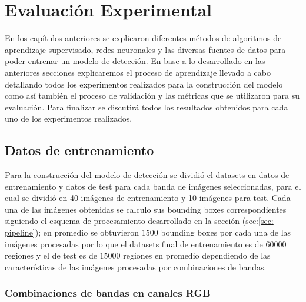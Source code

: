 \chapter{Evaluación Experimental}\label{chap:evaluacion}

En los capítulos anteriores se explicaron diferentes métodos de algoritmos de aprendizaje supervisado, redes neuronales y las diversas fuentes de datos para poder entrenar un modelo de detección. En  base a lo desarrollado en las anteriores secciones  explicaremos el proceso de aprendizaje llevado a cabo detallando todos los  experimentos realizados para la construcción del modelo como así también  el proceso de validación y las métricas que se utilizaron para su evaluación. Para finalizar se discutirá todos los resultados obtenidos para cada uno de los  experimentos realizados. 

\section{Datos de entrenamiento}\label{sec:datos_entrenamiento}

Para la construcción del modelo de detección se dividió el datasets en datos de entrenamiento y datos de test para cada banda de imágenes seleccionadas,  para el cual se dividió en 40 imágenes de entrenamiento y 10 imágenes para test. Cada una de las imágenes obtenidas se calculo sus bounding boxes correspondientes  siguiendo el esquema de procesamiento desarrollado  en la sección (sec:\ref{sec: pipeline}); en promedio se obtuvieron $1500$ bounding boxes por cada una de las imágenes procesadas por lo que el datasets final de entrenamiento es de $60000$ regiones y el de test es de $15000$ regiones en promedio dependiendo de las características de las imágenes procesadas por combinaciones de bandas. 

\subsection{Combinaciones de bandas en canales RGB}\label{sub:comb_de_banda} 


